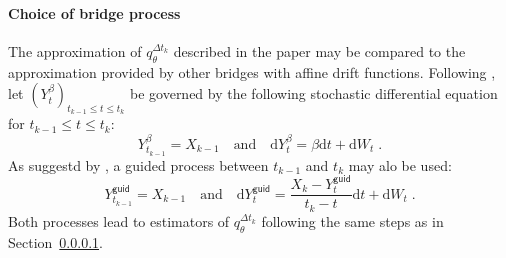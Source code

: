 \documentclass[12pt]{article}
\newcommand{\rmd}{\mathrm{d}}
\newcommand{\eqsp}{\;}
\newcommand{\1}{\mathrm{1}}
\begin{document}
\paragraph{Choice of bridge process}
The approximation of $q_{\theta}^{\Delta t_k}$ described in the paper may be compared to the approximation provided by other bridges with affine drift functions. Following \cite{}, let $(Y^{\beta}_t)_{t_{k-1}\le t\le t_k}$ be governed by the following stochastic differential equation for $t_{k-1}\le t\le t_k$:
\[
Y^{\beta}_{t_{k-1}} = X_{k-1}\quad\mbox{and}\quad\rmd Y^{\beta}_t = \beta\rmd t + \rmd W_t\eqsp.
\]
As suggestd by \cite{}, a guided process between $t_{k-1}$ and $t_k$ may alo be used:
\[
Y^{\mathsf{guid}}_{t_{k-1}} = X_{k-1}\quad\mbox{and}\quad\rmd Y^{\mathsf{guid}}_t = \frac{X_k - Y^{\mathsf{guid}}_t}{t_k-t}\rmd t + \rmd W_t\eqsp.
\]
Both processes lead to estimators of $q_{\theta}^{\Delta t_k}$ following the same steps as in Section~\ref{}.
\end{document}
